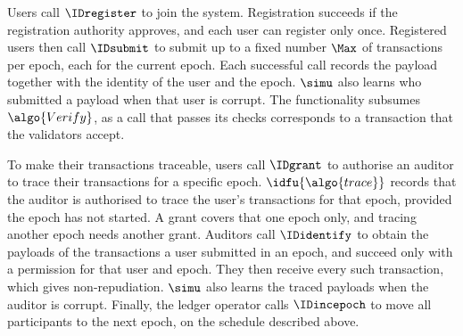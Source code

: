 Users call $\IDregister$ to join the system.
Registration succeeds if the registration authority approves, and each user can
register only once. Registered users then call $\IDsubmit$ to submit up to a
fixed number $\Max$ of transactions per epoch, each for the current epoch. Each
successful call records the payload together with the identity of the user and
the epoch. $\simu$ also learns who submitted a payload when that user is corrupt. The functionality subsumes
$\algo{Verify}$, as a call that passes its checks corresponds to a transaction that
the validators accept.

To make their transactions traceable, users call $\IDgrant$ to authorise an auditor to trace
their transactions for a specific epoch. $\idfu{\algo{trace}}$ records that the
auditor is authorised to trace the user's transactions for that epoch, provided the epoch has not started. A grant covers that one epoch
only, and tracing another epoch needs another grant.
Auditors call $\IDidentify$ to obtain the payloads of
the transactions a user submitted in an epoch, and succeed only with a
permission for that user and epoch. They then receive every such transaction,
which gives non-repudiation. $\simu$ also learns the traced payloads when the
auditor is corrupt. Finally, the ledger operator calls $\IDincepoch$ to move all
participants to the next epoch, on the schedule described above.

